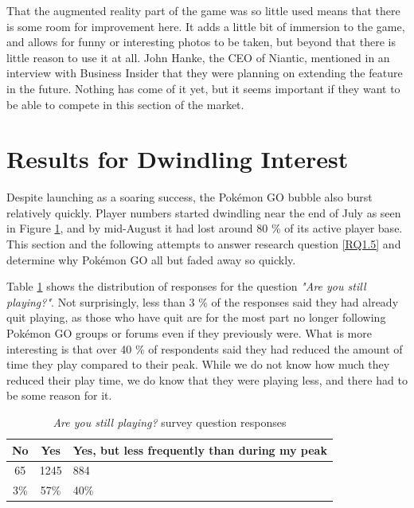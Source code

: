 That the augmented reality part of the game was so little used means that there is some room for improvement here. It adds a little bit of immersion to the game, and allows for funny or interesting photos to be taken, but beyond that there is little reason to use it at all. John Hanke, the CEO of Niantic, mentioned in an interview with Business Insider  that they were planning on extending the feature in the future. Nothing has come of it yet, but it seems important if they want to be able to compete in this section of the market.

\section{Results for Dwindling Interest}
Despite launching as a soaring success, the Pokémon GO bubble also burst relatively quickly. Player numbers started dwindling near the end of July as seen in Figure \ref{fig:player-numbers}, and by mid-August it had lost around 80 \%  of its active player base. This section and the following attempts to answer research question \ref{RQ1.5} and determine why Pokémon GO all but faded away so quickly.

\begin{figure}[h]
	\centering
	\caption{}
	\label{fig:player-numbers}
\end{figure}

Table \ref{tbl:still-playing} shows the distribution of responses for the question \emph{"Are you still playing?"}. Not surprisingly, less than 3 \% of the responses said they had already quit playing, as those who have quit are for the most part no longer following Pokémon GO groups or forums even if they previously were. What is more interesting is that over 40 \% of respondents said they had reduced the amount of time they play compared to their peak. While we do not know how much they reduced their play time, we do know that they were playing less, and there had to be some reason for it.

\begin{table}[h]
	\centering
	\caption{\emph{Are you still playing?} survey question responses}
	\label{tbl:still-playing}
	\begin{tabular}{|c|c|l|}
		\hline
		\textbf{No} & \textbf{Yes} & \textbf{Yes, but less frequently than during my peak}\\
		\hline\hline
		65 & 1245 & 884\\
		3\% & 57\% & 40\%\\\hline
	\end{tabular}
\end{table}

